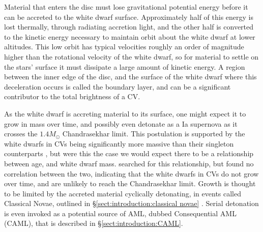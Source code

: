 Material that enters the disc must lose gravitational potential energy before it can be accreted to the white dwarf surface. Approximately half of this energy is lost thermally, through radiating accretion light, and the other half is converted to the kinetic energy necessary to maintain orbit about the white dwarf at lower altitudes. This low orbit has typical velocities roughly an order of magnitude higher than the rotational velocity of the white dwarf, so for material to settle on the stars' surface it must dissipate a large amount of kinetic energy. A region between the inner edge of the disc, and the surface of the white dwarf where this deceleration occurs is called the boundary layer, and can be a significant contributor to the total brightness of a CV. 

As the white dwarf is accreting material to its surface, one might expect it to grow in mass over time, and possibly even detonate as a Ia supernova as it crosses the $1.4 M_\odot$ Chandrasekhar limit. This postulation is supported by the white dwarfs in CVs being significantly more massive than their singleton counterparts , but were this the case we would expect there to be a relationship between age, and white dwarf mass. \citet{McAllister2019} searched for this relationship, but found no correlation between the two, indicating that the white dwarfs in CVs do not grow over time, and are unlikely to reach the Chandrasekhar limit. Growth is thought to be limited by the accreted material cyclically detonating, in events called Classical Novae, outlined in \S\ref{sect:introduction:classical novae} \citep{Wijnen2015,sparks2021}. Serial detonation is even invoked as a potential source of AML, dubbed Consequential AML (CAML), that is described in \S\ref{sect:introduction:CAML}.




